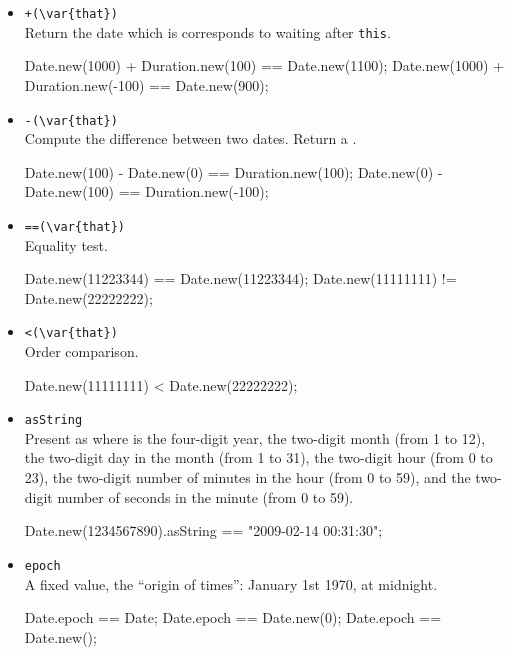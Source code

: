\begin{itemize}
\item \lstinline|+(\var{that})|\\
  Return the date which is corresponds to waiting 
   after \lstinline|this|.
\begin{urbiassert}[firstnumber=last]
Date.new(1000) + Duration.new(100) == Date.new(1100);
Date.new(1000) + Duration.new(-100) == Date.new(900);
\end{urbiassert}

\item \lstinline|-(\var{that})|\\
  Compute the difference between two dates.  Return a
  .
\begin{urbiassert}[firstnumber=last]
Date.new(100) - Date.new(0) == Duration.new(100);
Date.new(0) - Date.new(100) == Duration.new(-100);
\end{urbiassert}

\item \lstinline|==(\var{that})|\\
  Equality test.
\begin{urbiassert}[firstnumber=last]
Date.new(11223344) == Date.new(11223344);
Date.new(11111111) != Date.new(22222222);
\end{urbiassert}

\item \lstinline|<(\var{that})|\\
  Order comparison.
\begin{urbiassert}[firstnumber=last]
Date.new(11111111) < Date.new(22222222);
\end{urbiassert}

\item \lstinline|asString|\\
  Present as  where  is the four-digit
  year,  the two-digit month (from 1 to 12),  the
  two-digit day in the month (from 1 to 31),  the two-digit
  hour (from 0 to 23),  the two-digit number of minutes in the
  hour (from 0 to 59), and  the two-digit number of seconds in
  the minute (from 0 to 59).
\begin{urbiassert}[firstnumber=last]
Date.new(1234567890).asString == "2009-02-14 00:31:30";
\end{urbiassert}

\item \lstinline|epoch|\\
  A fixed value, the ``origin of times'': January 1st 1970, at
  midnight.
\begin{urbiassert}[firstnumber=last]
Date.epoch == Date;
Date.epoch == Date.new(0);
Date.epoch == Date.new();
\end{urbiassert}


\end{itemize}


